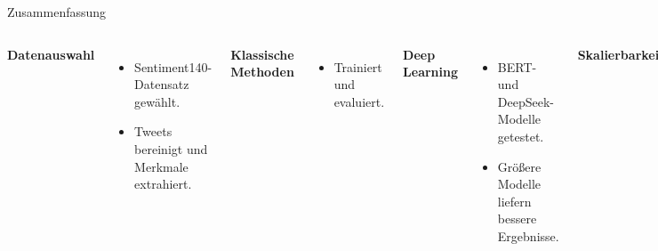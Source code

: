\documentclass[aspectratio=169]{beamer} %
\begin{document}
\begin{frame}{Zusammenfassung}
  \normalsize

  \begin{columns}[t]
      \textbf{Datenauswahl} \\[0.2cm]
      \begin{itemize}
          \item Sentiment140-Datensatz gewählt.
          \item Tweets bereinigt und Merkmale extrahiert.
      \end{itemize}

      \vspace{0.4cm}

      \textbf{Klassische Methoden} \\[0.2cm]
      \begin{itemize}
          \item Trainiert und evaluiert.
      \end{itemize}

      \vspace{0.4cm}

      \textbf{Deep Learning} \\[0.2cm]
      \begin{itemize}
          \item BERT- und DeepSeek-Modelle getestet.
          \item Größere Modelle liefern bessere Ergebnisse.
      \end{itemize}

      \textbf{Skalierbarkeit} \\[0.2cm]
      \begin{itemize}
          \item Fine-Tuning großer DeepSeek-Modelle nicht möglich.
          \item Zero-Shot-Ansatz genutzt.
      \end{itemize}

      \vspace{0.4cm}

      \textbf{Ausblick} \\[0.2cm]
      \begin{itemize}
          \item Fine-Tuning auf größeren Modellen prüfen.
          \item Optimierung bestehender Modelle.
      \end{itemize}

      \vspace{0.4cm}

      \pause

      {\large \textbf{Vielen Dank für Ihre Aufmerksamkeit!}} \\[0.1cm]
      \textit{Fragen?}

  \end{columns}

\end{frame}
\end{document}
